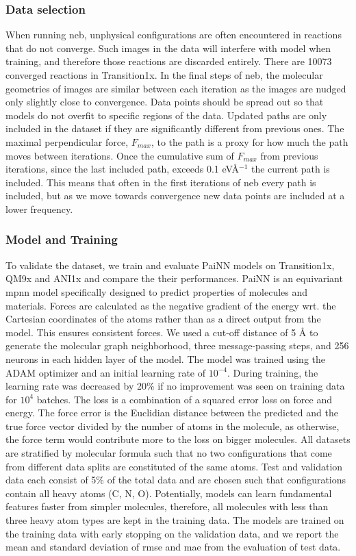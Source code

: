 \documentclass[twoside,twocolumn]{article}
\begin{document}
\subsubsection*{Data selection}
When running \gls{neb}, unphysical configurations are often encountered in reactions that do not converge. Such images in the data will interfere with model when training, and therefore those reactions are discarded entirely. There are 10073 converged reactions in Transition1x. In the final steps of \gls{neb}, the molecular geometries of images are similar between each iteration as the images are nudged only slightly close to convergence. Data points should be spread out so that models do not overfit to specific regions of the data. Updated paths are only included in the dataset if they are significantly different from previous ones. The maximal perpendicular force, $F_{max}$, to the path is a proxy for how much the path moves between iterations. Once the cumulative sum of $F_{max}$ from previous iterations, since the last included path, exceeds 0.1 eVÅ$^{-1}$ the current path is included. This means that often in the first iterations of \gls{neb} every path is included, but as we move towards convergence new data points are included at a lower frequency. 

\subsubsection*{Model and Training}
To validate the dataset, we train and evaluate PaiNN \cite{painn} models on Transition1x, QM9x and ANI1x and compare the their performances. PaiNN is an equivariant \gls{mpnn}\cite{mpnn} model specifically designed to predict properties of molecules and materials. Forces are calculated as the negative gradient of the energy wrt. the Cartesian coordinates of the atoms rather than as a direct output from the model. This ensures consistent forces. We used a cut-off distance of 5 Å to generate the molecular graph neighborhood, three message-passing steps, and 256 neurons in each hidden layer of the model. The model was trained using the ADAM \cite{adam} optimizer and an initial learning rate of $10^{-4}$. During training, the learning rate was decreased by 20\% if no improvement was seen on training data for $10^4$ batches. The loss is a combination of a squared error loss on force and energy. The force error is the Euclidian distance between the predicted and the true force vector divided by the number of atoms in the molecule, as otherwise, the force term would contribute more to the loss on bigger molecules. All datasets are stratified by molecular formula such that no two configurations that come from different data splits are constituted of the same atoms. Test and validation data each consist of 5\% of the total data and are chosen such that configurations contain all heavy atoms (C, N, O). Potentially, models can learn fundamental features faster from simpler molecules, therefore, all molecules with less than three heavy atom types are kept in the training data. The models are trained on the training data with early stopping on the validation data, and we report the mean and standard deviation of \gls{rmse} and \gls{mae} from the evaluation of test data.
\end{document}
